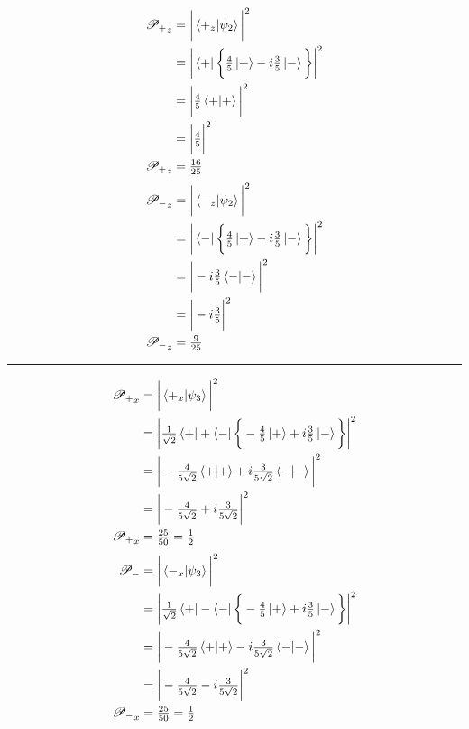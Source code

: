 \documentclass[paper=a4, fontsize=11pt]{scrartcl} %
\numberwithin{equation}{section} %
\numberwithin{figure}{section} %
\numberwithin{table}{section} %
\newcommand{\horrule}[1]{\rule{\linewidth}{#1}} %
\begin{document}
\begin{multicols}{2}
\noindent
	\begin{align*}
\mathscr{P_+}_z & = \bigg | \braket{+_z|\psi_2} \bigg|^2 \\
& = \bigg | \bra{+}  \bigg \{ \tfrac{4}{5}\ket{+} - i\tfrac{3}{5}\ket{-} \bigg \} \bigg |^2 \\
& = \bigg |  \tfrac{4}{5}\braket{+|+}  \bigg |^2 \\
  & = \bigg |  \tfrac{4}{5} \bigg |^2 \\
  \mathscr{P_+}_z & = \tfrac{16}{25}
	\end{align*}
	\begin{align*}
\mathscr{P_-}_z & = \bigg |  \braket{-_z|\psi_2} \bigg|^2 \\
& = \bigg |  \bra{-} \bigg \{ \tfrac{4}{5}\ket{+} - i\tfrac{3}{5}\ket{-} \bigg \} \bigg |^2 \\
& = \bigg |  -  i\tfrac{3}{5} \braket{-|-}  \bigg |^2 \\
 & = \bigg | - i \tfrac{3}{5} \bigg |^2 \\
  \mathscr{P_-}_z & = \tfrac{9}{25}
	\end{align*}
\end{multicols}
\horrule{2pt} 
 \begin{multicols}{2}
 \noindent
\begin{align*}
\mathscr{P_+}_x & = \bigg | \braket{+_x|\psi_3} \bigg|^2 \\
& = \bigg | \tfrac{1}{\sqrt{2}}\bra{+} + \bra{-} \bigg \{ -\tfrac{4}{5}\ket{+} + i\tfrac{3}{5}\ket{-} \bigg \} \bigg |^2 \\
& = \bigg |  -\tfrac{4}{5\sqrt{2}}\braket{+|+} + i\tfrac{3}{5\sqrt{2}} \braket{-|-}  \bigg |^2 \\
  & = \bigg | - \tfrac{4}{5\sqrt{2}} + i\tfrac{3}{5\sqrt{2}} \bigg |^2 \\
  \mathscr{P_+}_x & = \tfrac{25}{50} = \tfrac{1}{2}
  \end{align*}
   \begin{align*}
\mathscr{P_-} & = \bigg |  \braket{-_x|\psi_3} \bigg|^2 \\
& = \bigg | \tfrac{1}{\sqrt{2}} \bra{+} -\bra{-} \bigg \{- \tfrac{4}{5}\ket{+} + i\tfrac{3}{5}\ket{-} \bigg \} \bigg |^2 \\
& = \bigg |  -\tfrac{4}{5\sqrt{2}}\braket{+|+} - i\tfrac{3}{5\sqrt{2}} \braket{-|-}  \bigg |^2 \\
 & = \bigg |  -\tfrac{4}{5\sqrt{2}} - i\tfrac{3}{5\sqrt{2}} \bigg |^2 \\
  \mathscr{P_-}_x & = \tfrac{25}{50} = \tfrac{1}{2}
  \end{align*}
  \end{multicols}
\end{document}
